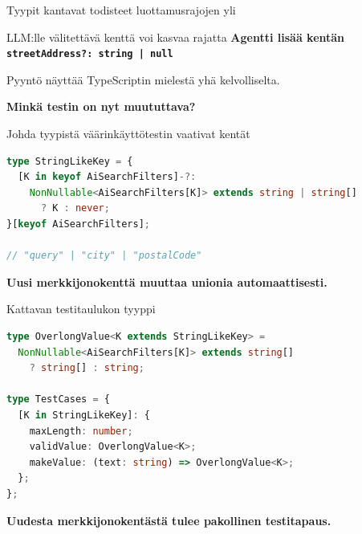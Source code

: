 \documentclass[10pt,aspectratio=169]{beamer}
\newcommand{\bottomline}[2][DeckAccent]{%
  \vfill{\color{#1}\large\bfseries #2}\par
}
\begin{document}
{\begin{frame}[t]{Tyypit kantavat todisteet luottamusrajojen yli}
\end{frame}}

\begin{frame}{LLM:lle välitettävä kenttä voi kasvaa rajatta}
  \vspace{8mm}
  {\Large\bfseries Agentti lisää kentän \texttt{streetAddress?: string | null}}\par
  \vspace{12mm}
  {\color{DeckMuted}\Large Pyyntö näyttää TypeScriptin mielestä yhä kelvolliselta.}\par
  \vspace{13mm}
  {\color{DeckAccent}\fontsize{24}{28}\selectfont\bfseries Minkä testin on nyt muututtava?}
\end{frame}

\begin{frame}[fragile]{Johda tyypistä väärinkäyttötestin vaativat kentät}
\begin{lstlisting}[style=deckcode,language=TypeScript]
type StringLikeKey = {
  [K in keyof AiSearchFilters]-?:
    NonNullable<AiSearchFilters[K]> extends string | string[]
      ? K : never;
}[keyof AiSearchFilters];

// "query" | "city" | "postalCode"
\end{lstlisting}
  \bottomline{Uusi merkkijonokenttä muuttaa unionia automaattisesti.}
\end{frame}

\begin{frame}[fragile]{Kattavan testitaulukon tyyppi}
\begin{lstlisting}[style=deckcode,language=TypeScript]
type OverlongValue<K extends StringLikeKey> =
  NonNullable<AiSearchFilters[K]> extends string[]
    ? string[] : string;

type TestCases = {
  [K in StringLikeKey]: {
    maxLength: number;
    validValue: OverlongValue<K>;
    makeValue: (text: string) => OverlongValue<K>;
  };
};
\end{lstlisting}
  \bottomline{Uudesta merkkijonokentästä tulee pakollinen testitapaus.}
\end{frame}
\end{document}
